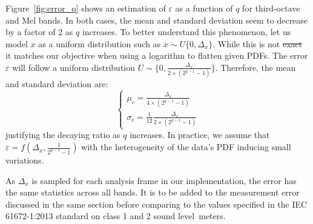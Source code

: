 \documentclass[sensors,article,accept,moreauthors,pdftex,10pt,a4paper]{mdpi}
\providecommand{\DIFaddtex}[1]{{\protect\color{blue}\uwave{#1}}} %
\providecommand{\DIFdeltex}[1]{{\protect\color{red}\sout{#1}}}                      %
\providecommand{\DIFaddbegin}{} %
\providecommand{\DIFaddend}{} %
\providecommand{\DIFdelbegin}{} %
\providecommand{\DIFdelend}{} %
\providecommand{\DIFadd}[1]{\texorpdfstring{\DIFaddtex{#1}}{#1}} %
\providecommand{\DIFdel}[1]{\texorpdfstring{\DIFdeltex{#1}}{}} %
\begin{document}
\DIFaddend Figure~\ref{fig:error_q} shows an estimation of $\varepsilon$ as a function of $q$ for third-octave and Mel bands. In both cases, the mean and standard deviation seem to decrease by a factor of 2 as $q$ increases. To better understand this phenomenon, let us model $x$ as a uniform distribution such as $x\sim \textit{U}\{0, \Delta_x\}$. While this is not \DIFdelbegin \DIFdel{exact }\DIFdelend \DIFaddbegin {\DIFadd{exact,}} \DIFaddend it matches our objective when using a logarithm to flatten given PDFs. The error $\varepsilon$ will follow a uniform distribution $U\sim \{0, \frac{\Delta_x}{2\times (2^{q-1}-1)}\}$. Therefore, the mean and standard deviation are:
\[
\begin{cases}
	\mu_\epsilon = \frac{\Delta_x}{4\times (2^{q-1}-1)}\\
	\sigma_\epsilon = \frac{1}{12}\frac{\Delta_x}{2\times (2^{q-1}-1)}
\end{cases}
\]
justifying the decaying ratio as $q$ increases. In practice, we assume that $\varepsilon = f(\Delta_x, \frac{1}{2^{q-1}-1})$ with the heterogeneity of the data's PDF inducing small variations.

As $\Delta_x$ is sampled for each analysis frame in our implementation, the error has the same statistics across all bands. It is to be added to the measurement error discussed in the same section before comparing to the values specified in the IEC 61672-1:2013 \cite{iec-norm2} standard on class 1 and 2 sound \mbox{level meters.}
\end{document}
